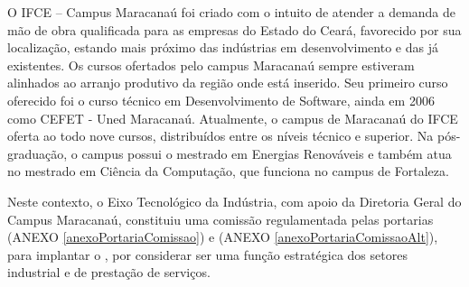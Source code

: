 O IFCE – Campus Maracanaú foi criado com o intuito de atender a demanda de mão de obra qualificada para as empresas do Estado do Ceará, favorecido por sua localização, estando mais próximo das indústrias em desenvolvimento e das já
existentes. Os cursos ofertados pelo campus Maracanaú sempre estiveram alinhados ao arranjo produtivo da região onde está inserido. Seu primeiro curso oferecido foi o curso técnico em Desenvolvimento de Software, ainda em 2006 como CEFET - Uned Maracanaú. Atualmente, o campus de Maracanaú do IFCE oferta ao todo nove cursos, distribuídos entre os níveis técnico e superior. Na pós-graduação, o campus possui o mestrado em Energias Renováveis e também atua no mestrado em Ciência da Computação, que funciona no campus de Fortaleza.

Neste contexto, o Eixo Tecnológico da Indústria, com apoio da Diretoria Geral do Campus Maracanaú, constituiu uma comissão regulamentada pelas portarias  \PORTARIACOMISSAO (ANEXO \ref{anexoPortariaComissao}) e  \PORTARIACOMISSAOALT (ANEXO \ref{anexoPortariaComissaoAlt}), para implantar 
o \NOMECURSO, por considerar ser uma função estratégica dos setores industrial e de prestação de serviços.